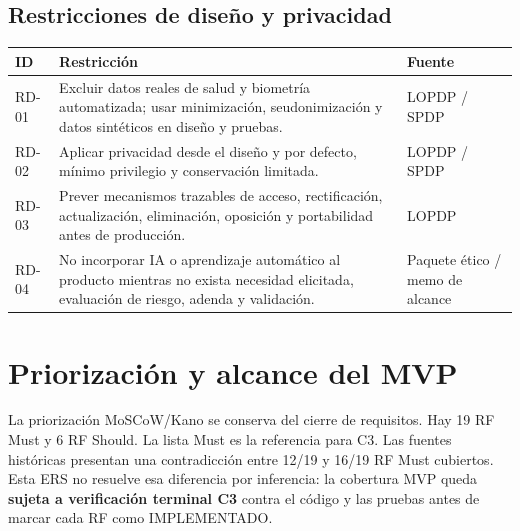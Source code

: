 \documentclass[11pt,a4paper,twoside]{article}
\begin{document}
\subsection{Restricciones de diseño y privacidad}
\begin{tabularx}{\textwidth}{p{2.5cm}X p{3.2cm}}\toprule
ID & Restricción & Fuente \\ \midrule
RD-01 & Excluir datos reales de salud y biometría automatizada; usar minimización, seudonimización y datos sintéticos en diseño y pruebas. & LOPDP / SPDP \\
RD-02 & Aplicar privacidad desde el diseño y por defecto, mínimo privilegio y conservación limitada. & LOPDP / SPDP \\
RD-03 & Prever mecanismos trazables de acceso, rectificación, actualización, eliminación, oposición y portabilidad antes de producción. & LOPDP \\
RD-04 & No incorporar IA o aprendizaje automático al producto mientras no exista necesidad elicitada, evaluación de riesgo, adenda y validación. & Paquete ético / memo de alcance \\
\bottomrule\end{tabularx}

\section{Priorización y alcance del MVP}
La priorización MoSCoW/Kano se conserva del cierre de requisitos. Hay 19 RF Must y 6 RF Should. La lista Must es la referencia para C3. Las fuentes históricas presentan una contradicción entre 12/19 y 16/19 RF Must cubiertos. Esta ERS no resuelve esa diferencia por inferencia: la cobertura MVP queda \textbf{sujeta a verificación terminal C3} contra el código y las pruebas antes de marcar cada RF como IMPLEMENTADO.
\end{document}

